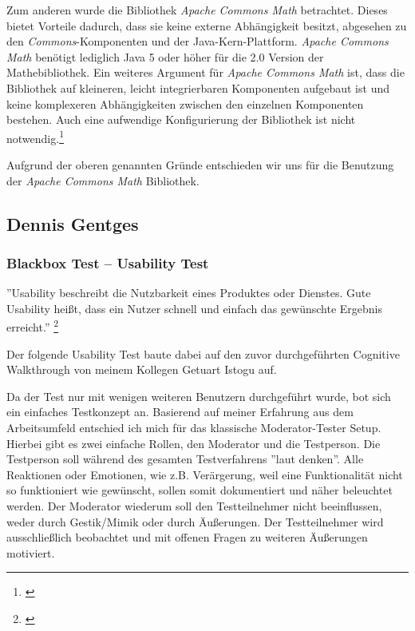 Zum anderen wurde die Bibliothek \textit{Apache Commons Math} betrachtet. Dieses bietet Vorteile dadurch, dass sie keine externe Abhängigkeit besitzt, abgesehen zu den \textit{Commons}-Komponenten und der Java-Kern-Plattform. \textit{Apache Commons Math} benötigt lediglich Java 5 oder höher für die 2.0 Version der Mathebibliothek. Ein weiteres Argument für \textit{Apache Commons Math} ist, dass die Bibliothek auf kleineren, leicht integrierbaren Komponenten aufgebaut ist und keine komplexeren Abhängigkeiten zwischen den einzelnen Komponenten bestehen. Auch eine aufwendige Konfigurierung der Bibliothek ist nicht notwendig.\footnote{\cite[vgl.][]{Apache2016}}

Aufgrund der oberen genannten Gründe entschieden wir uns für die Benutzung der \textit{Apache Commons Math} Bibliothek.

\clearpage

\subsection{Dennis Gentges}

\subsubsection{Blackbox Test – Usability Test}

''Usability beschreibt die Nutzbarkeit eines Produktes oder Dienstes. Gute Usability heißt, dass ein Nutzer schnell und einfach das gewünschte Ergebnis erreicht.'' \footnote{\cite[][]{msodigital}} 

Der folgende Usability Test baute dabei auf den zuvor durchgeführten Cognitive Walkthrough von meinem Kollegen Getuart Istogu auf.

Da der Test nur mit wenigen weiteren Benutzern durchgeführt wurde, bot sich ein einfaches Testkonzept an. Basierend auf meiner Erfahrung aus dem Arbeitsumfeld entschied ich mich für das klassische Moderator-Tester Setup. Hierbei gibt es zwei einfache Rollen, den Moderator und die Testperson. Die Testperson soll während des gesamten Testverfahrens ''laut denken''. Alle Reaktionen oder Emotionen, wie z.B. Verärgerung, weil eine Funktionalität nicht so funktioniert wie gewünscht, sollen somit dokumentiert und näher beleuchtet werden. Der Moderator wiederum soll den Testteilnehmer nicht beeinflussen, weder durch Gestik/Mimik oder durch Äußerungen. Der Testteilnehmer wird ausschließlich beobachtet und mit offenen Fragen zu weiteren Äußerungen motiviert. 

